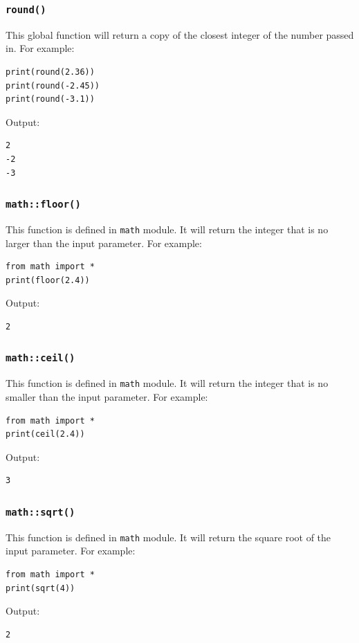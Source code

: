 \documentclass[12pt]{book}
\begin{document}
\subsubsection{\texttt{round()}}
\label{sec:org77c79a3}
This global function will return a copy of the closest integer of the number passed in. For example:
\begin{verbatim}
print(round(2.36))
print(round(-2.45))
print(round(-3.1))
\end{verbatim}
Output:
\begin{verbatim}
2
-2
-3
\end{verbatim}

\subsubsection{\texttt{math::floor()}}
\label{sec:org474d3e7}
This function is defined in \texttt{math} module. It will return the integer that is no larger than the input parameter. For example:
\begin{verbatim}
from math import *
print(floor(2.4))
\end{verbatim}
Output:
\begin{verbatim}
2
\end{verbatim}

\subsubsection{\texttt{math::ceil()}}
\label{sec:orgb4330aa}
This function is defined in \texttt{math} module. It will return the integer that is no smaller than the input parameter. For example:
\begin{verbatim}
from math import *
print(ceil(2.4))
\end{verbatim}
Output:
\begin{verbatim}
3
\end{verbatim}

\subsubsection{\texttt{math::sqrt()}}
\label{sec:orgafdfb79}
This function is defined in \texttt{math} module. It will return the square root of the input parameter. For example:
\begin{verbatim}
from math import *
print(sqrt(4))
\end{verbatim}
Output:
\begin{verbatim}
2
\end{verbatim}
\end{document}
